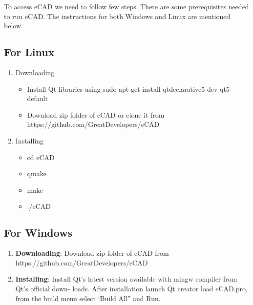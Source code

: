 To access eCAD we need to follow few steps. There are some prerequisites
needed to run eCAD. The instructions for both Windows and Linux are mentioned below.
\subsection{For Linux}
\begin{enumerate}
\item Downloading
\begin{itemize}
\item Install Qt libraries using sudo apt-get install qtdeclarative5-dev qt5-default
\item Download zip folder of eCAD or clone it from https://github.com/GreatDevelopers/eCAD
\end{itemize}
\item Installing
\begin{itemize}
\item cd eCAD
\item qmake
\item make
\item ./eCAD
\end{itemize}
\end{enumerate}

\subsection{For Windows}
\begin{enumerate}
\item \textbf{Downloading}: Download zip folder of eCAD from https://github.com/GreatDevelopers/eCAD
\item \textbf{Installing}:  Install Qt’s latest version available with mingw compiler from Qt’s official down-
loads. After installation launch Qt creator load eCAD.pro, from the build menu select
‘Build All” and Run.
\end{enumerate}

